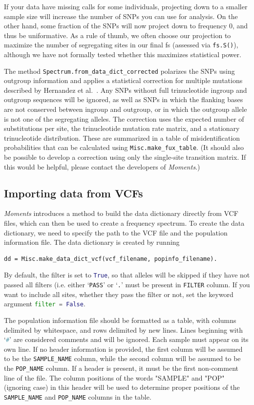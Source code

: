 \documentclass[12pt]{article}
\makeatletter
\newcommand{\py}[1]{\lstinline[breaklines=true,language=Python, showstringspaces=False]@#1@}
\makeatother
\begin{document}
If your data have missing calls for some individuals, projecting down to a smaller sample size will increase the number of SNPs you can use for analysis.
On the other hand, some fraction of the SNPs will now project down to frequency 0, and thus be uniformative.
As a rule of thumb, we often choose our projection to maximize the number of segregating sites in our final fs (assessed via \py{fs.S()}), although we have not formally tested whether this maximizes statistical power.

The method \py{Spectrum.from_data_dict_corrected} polarizes the SNPs using outgroup information and applies a statistical correction for multiple mutations described by Hernandez et al.~\cite{bib:Hernandez2007}.
Any SNPs without full trinucleotide ingroup and outgroup sequences will be ignored, as well as SNPs in which the flanking bases are not conserved between ingroup and outgroup, or in which the outgroup allele is not one of the segregating alleles.
The correction uses the expected number of substitutions per site, the trinucleotide mutation rate matrix, and a stationary trinucleotide distribution.
These are summarized in a table of misidentification probabilities that can be calculated using \py{Misc.make_fux_table}.
(It should also be possible to develop a correction using only the single-site transition matrix.
If this would be helpful, please contact the developers of \textit{Moments}.)

\subsection{Importing data from VCFs}

\textit{Moments} introduces a method to build the data dictionary directly from VCF files, which can then be used to create a frequency spectrum.
To create the data dictionary, we need to specify the path to the VCF file and the population information file.
The data dictionary is created by running
\begin{lstlisting}
dd = Misc.make_data_dict_vcf(vcf_filename, popinfo_filename).
\end{lstlisting}
By default, the filter is set to \py{True}, so that alleles will be skipped if they have not passed all filters (i.e. either `\py{PASS}' or `\py{.}' must be present in \py{FILTER} column.
If you want to include all sites, whether they pass the filter or not, set the keyword argument \py{filter = False}.

The population information file should be formatted as a table, with columns delimited by whitespace, and rows delimited by new lines. 
Lines beginning with `\py{#}' are considered comments and will be ignored.
Each sample must appear on its own line.
If no header information is provided, the first column will be assumed to be the \py{SAMPLE_NAME} column, while the second column will be assumed to be the \py{POP_NAME} column.
If a header is present, it must be the first non-comment line of the file. 
The column positions of the words "SAMPLE" and "POP" (ignoring case) in this header will be used to determine proper positions of the \py{SAMPLE_NAME} and \py{POP_NAME} columns in the table.
\end{document}
